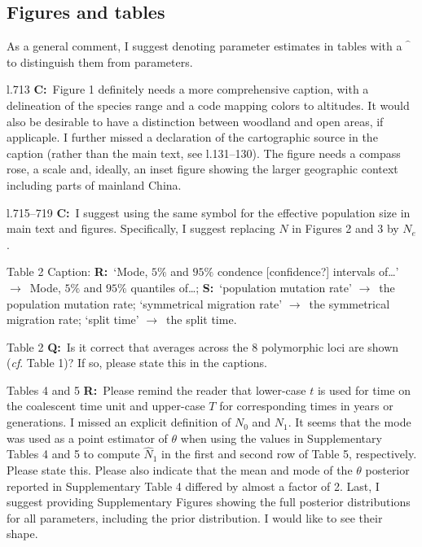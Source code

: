 \documentclass[11pt]{article}
\newenvironment{my_description}
{\begin{description}
  \setlength{\itemsep}{2pt}
  \setlength{\parskip}{0pt}
  \setlength{\parsep}{0pt}}
{\end{description}}
\newcommand{\ra}{$\rightarrow$\ }
\newcommand{\C}{\textbf{C:}\ }
\newcommand{\Q}{\textbf{Q:}\ }
\newcommand{\R}{\textbf{R:}\ }
\newcommand{\V}{\textbf{S:}\ }
\begin{document}
\subsection{Figures and tables}
As a general comment, I suggest denoting parameter estimates in tables with a $\hat{\phantom{t}}$ to distinguish them from parameters.
\begin{my_description}
\item[l.713] \C Figure 1 definitely needs a more comprehensive caption, with a delineation of the species range and a code mapping colors to altitudes. It would also be desirable to have a distinction between woodland and open areas, if applicaple. I further missed a declaration of the cartographic source in the caption (rather than the main text, see l.131--130). The figure needs a compass rose, a scale and, ideally, an inset figure showing the larger geographic context including parts of mainland China.
	\item[l.715--719] \C I suggest using the same symbol for the effective population size in main text and figures. Specifically, I suggest replacing $N$ in Figures 2 and 3 by $N_e$.
	\item[Table 2] Caption: \R `Mode, $5\%$ and $95\%$ condence [confidence?] intervals of\dots' \ra Mode, $5\%$ and $95\%$ quantiles of\dots; \V `population mutation rate' \ra the population mutation rate; `symmetrical migration rate' \ra the symmetrical migration rate; `split time' \ra the split time.
	\item[Table 2]  \Q Is it correct that averages across the 8 polymorphic loci are shown (\emph{cf}. Table 1)? If so, please state this in the captions.
	\item[Tables 4 and 5] \R Please remind the reader that lower-case $t$ is used for time on the coalescent time unit and upper-case $T$ for corresponding times in years or generations. I missed an explicit definition of $N_0$ and $N_1$. It seems that the mode was used as a point estimator of $\theta$ when using the values in Supplementary Tables 4 and 5 to compute $\hat{N}_1$ in the first and second row of Table 5, respectively. Please state this. Please also indicate that the mean and mode of the $\theta$ posterior reported in Supplementary Table 4 differed by almost a factor of 2.  Last, I suggest providing Supplementary Figures showing the full posterior distributions for all parameters, including the prior distribution. I would like to see their shape.
\end{my_description}
\end{document}
